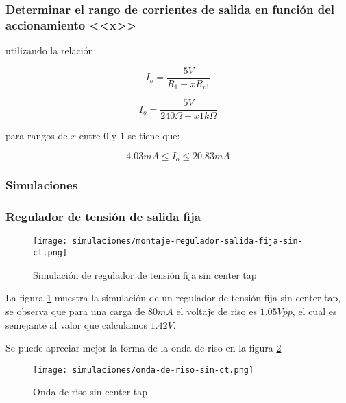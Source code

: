 \subsubsection*{Determinar el rango de corrientes de salida en función del accionamiento <<x>>}

utilizando la relación:

\begin{equation}
    I_o = \frac{5V}{R_1 + xR_{v1}}
\end{equation}

\begin{equation}
    I_o = \frac{5V}{240 \Omega + x 1k \Omega}
\end{equation}

para rangos de $x$ entre $0$ y $1$ se tiene que:

\begin{equation*}
    4.03 mA \leq I_o \leq 20.83 mA 
\end{equation*}

\subsubsection{Simulaciones}

\subsubsection*{Regulador de tensión de salida fija}

\begin{figure}[ht]
    \centering
    \texttt{[image: simulaciones/montaje-regulador-salida-fija-sin-ct.png]}
    \caption{Simulación de regulador de tensión fija sin center tap}
    \label{fig:simulacion-regulador-tension-fija-sin-ct}
\end{figure}

La figura \ref{fig:simulacion-regulador-tension-fija-sin-ct} muestra la simulación de un regulador de tensión fija sin center tap, se observa que para una carga de $80mA$ el voltaje de riso es $1.05 Vpp$, el cual es semejante al valor que calculamos $1.42 V$.

Se puede apreciar mejor la forma de la onda de riso en la figura \ref{fig:onda-de-riso-sin-ct} 

\begin{figure}[ht]
    \centering
    \texttt{[image: simulaciones/onda-de-riso-sin-ct.png]}
    \caption{Onda de riso sin center tap}
    \label{fig:onda-de-riso-sin-ct}
\end{figure}

